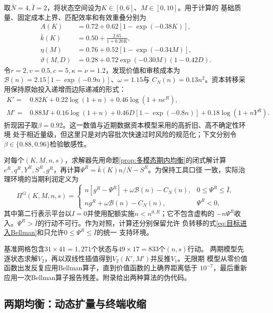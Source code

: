 \documentclass[UTF8, a4paper, 12pt, fontset=fandol]{ctexart}
\theoremstyle{definition}
\theoremstyle{remark}
\begin{document}
取$\bar N=4,\bar I=2$，将状态空间设为$K\in[0,6]$、$M\in[0,10]$。用于计算的
基础质量、固定成本上界、匹配效率和有效重叠分别为
\begin{align}
  A(K)&=0.72+0.62[1-\exp(-0.38K)],\\
  \bar k(K)&=0.50+\frac{2.65}{1+0.20K},\\
  \eta(M)&=0.76+0.52[1-\exp(-0.34M)],\\
  \vartheta(M,D)&=0.28+0.72\exp(-0.30M)(1-0.42D).
  \label{eq:数值期内原语}
\end{align}
令$r=2,v=0.5,c=5,\kappa=\nu=1.2$，发现价值和审核成本为
$\mathcal B(n)=2.15[1-\exp(-0.9n)]$、$\omega=1.15$与
$C_N(n)=0.13n^2$。资本转移采用保持原始投入递增而边际递减的形式：
\begin{align}
  K'={}&0.82K+0.22\log(1+n)+0.46\log(1+ne^R),\\
  M'={}&0.88M+0.16\log(1+n)
  +0.46D[1-\exp(-0.8n)]+0.18\log(1+nY^R).
  \label{eq:数值状态转移}
\end{align}
折现因子取$\beta=0.92$。这一数值与近期数据资本模型采用的高折旧、高不确定性环境
处于相近量级，但这里只是对内容批次快速过时风险的规范化；下文分别令
$\beta\in\{0.88,0.96\}$检验敏感性。

对每个$(K,M,n,s)$，求解器先用命题\ref{prop:多模态期内均衡}的闭式解计算
$e^R,q^R,Y^R,S^R,g^R$，再计算$\Psi^R=\bar k(K)n/\bar N-S^R$。为保持工具口径
一致，实际治理环境的当期利润定义为
\begin{equation}
  \Pi^G(K,M,n,s)=
  \begin{cases}
    n[g^R-\Psi^R]+\omega\mathcal B(n)-C_N(n),
      &0\leq\Psi^R\leq\bar I,\\
    ng^R+\omega\mathcal B(n)-C_N(n),
      &\Psi^R<0,
  \end{cases}
  \label{eq:数值治理利润}
\end{equation}
其中第二行表示平台以$I=0$并使用配额实施$n<n^{0,R}$；它不包含虚构的
$-n\Psi^R$收入。$\Psi^R>\bar I$的行动不可行。作为对照，计算还分别保留允许
负转移的式\eqref{eq:目标进入Bellman}和只允许$0\leq\Psi^R\leq\bar I$的统一
支持环境。

基准网格包含$31\times41=1{,}271$个状态与$49\times17=833$个$(n,s)$行动。
两期模型先逐状态求解$V_2$，再以双线性插值得到$V_2(K',M')$并反推$V_1$。无限期
模型从零价值函数出发反复应用Bellman算子，直到价值函数的上确界距离低于
$10^{-7}$，最后重新应用一次Bellman算子报告残差。附录给出两种算法的伪代码。

\subsection{两期均衡：动态扩量与终端收缩}
\end{document}
